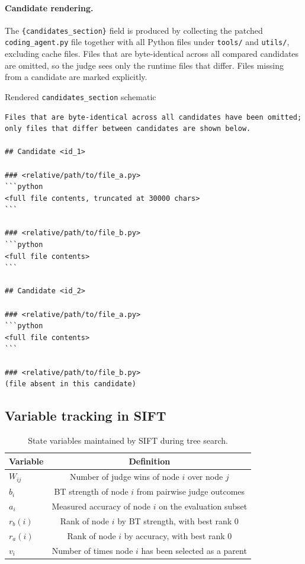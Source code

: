 \documentclass{article}
\newcommand{\slot}[1]{\textcolor{slotcolor}{\texttt{\{#1\}}}}
\begin{document}
\paragraph{Candidate rendering.}
The \slot{candidates\_section} field is produced by collecting the patched \texttt{coding\_agent.py} file together with all Python files under \texttt{tools/} and \texttt{utils/}, excluding cache files. Files that are byte-identical across all compared candidates are omitted, so the judge sees only the runtime files that differ. Files missing from a candidate are marked explicitly.

\begin{promptbox}{Rendered \texttt{candidates\_section} schematic}
\begin{Verbatim}[breaklines=true,breakanywhere=true,fontsize=\small]
Files that are byte-identical across all candidates have been omitted; only files that differ between candidates are shown below.

## Candidate <id_1>

### <relative/path/to/file_a.py>
```python
<full file contents, truncated at 30000 chars>
```

### <relative/path/to/file_b.py>
```python
<full file contents>
```

## Candidate <id_2>

### <relative/path/to/file_a.py>
```python
<full file contents>
```

### <relative/path/to/file_b.py>
(file absent in this candidate)
\end{Verbatim}
\end{promptbox}





\subsection{Variable tracking in SIFT}
\begin{table}[ht]
\centering
\caption{State variables maintained by SIFT during tree search.}
\label{tab:sift_state}
\begin{tabular}{lc}
\toprule
\textbf{Variable} & \textbf{Definition} \\
\midrule
$W_{ij}$ & Number of judge wins of node $i$ over node $j$ \\
$b_i$ & BT strength of node $i$ from pairwise judge outcomes \\
$a_i$ & Measured accuracy of node $i$ on the evaluation subset\\
$r_b(i)$ & Rank of node $i$ by BT strength, with best rank $0$\\
$r_a(i)$ & Rank of node $i$ by accuracy, with best rank $0$  \\
$v_i$ & Number of times node $i$ has been selected as a parent \\
\bottomrule
\end{tabular}
\end{table}
\end{document}
